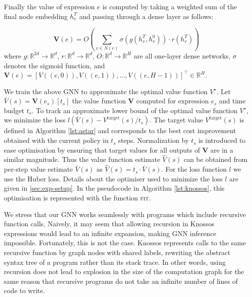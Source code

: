 \documentclass[fullpage,twocolumn]{article} %
\newcommand{\Vtarget}{V^\text{target}}
\begin{document}
Finally the value of expression $e$ is computed by taking a weighted sum of the final node embedding $h_v^{T}$ and passing through a dense layer as follows:

\begin{equation}
    \boldsymbol{V}(e) = \textstyle O\left(\sum_{v\in N(e)}\sigma\left(g(h_v^{T}, h_v^{0})\right)\cdot r(h_v^{T})\right)
\end{equation}
where $g:\mathbb{R}^{2d}\rightarrow\mathbb{R}^d$, $r:\mathbb{R}^d\rightarrow\mathbb{R}^d$, $O:\mathbb{R}^d\rightarrow\mathbb{R}^H$ are all one-layer dense networks, $\sigma$ denotes the sigmoid function, and $\boldsymbol{V}(e) = [V((e,0)), V((e,1)),\ldots,V((e, H-1))]^\top\in\mathbb{R}^H$.


We train the above GNN to approximate the optimal value function $V^\star$. Let $\bar{V}(s)=\boldsymbol{V}(e_s)[t_s]$ the value function $\boldsymbol{V}$ computed for expression $e_s$ and time budget $t_s$.
%
To track an approximate lower bound of the optimal value function $V^\star$,
we minimize the loss $l(\bar{V}(s) - \Vtarget(s) / t_s)$. The target value $\Vtarget(s)$ is defined in Algorithm \ref{lst:astar} and corresponds to the best cost improvement obtained with the current policy in $t_s$ steps.
Normalization by $t_s$ is introduced to ease optimisation by ensuring that target values for all outputs of $\boldsymbol{V}$ are in a similar magnitude. Thus the value function estimate $\hat{V}(s)$ can be obtained from per-step value estimate $\bar{V}(s)$ as $\hat{V}(s)=t_s\cdot \bar{V}(s)$.
For the loss function $l$ we use the Huber loss. Details about the optimiser used to minimize the loss $l$ are given in  \ref{sec:exp-setup}. In the pseudocode in Algorithm \ref{lst:knossos}, this optimisation is represented with the function \textsc{fit}.


We stress that our GNN works seamlessly with programs which include recursive function calls. Naively, it may seem that allowing recursion in Knossos expressions would lead to an infinite expansion, making GNN inference impossible. Fortunately, this is not the case.  Knossos represents calls to the same recursive function by graph nodes with shared labels, rewriting the abstract syntax tree of a program rather than its stack trace. In other words, using recursion does not lead to explosion in the size of the computation graph for the same reason that recursive programs do not take an infinite number of lines of code to write. %
\end{document}
